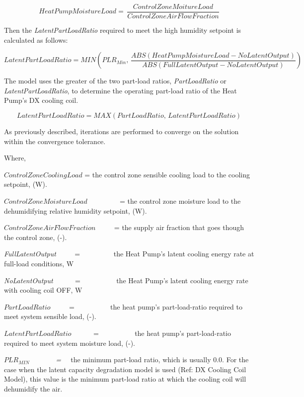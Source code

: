\begin{equation}
HeatPumpMoistureLoad = \,\frac{{ControlZoneMoitureLoad}}{{ControlZoneAirFlowFraction}}
\end{equation}

Then the \emph{LatentPartLoadRatio} required to meet the high humidity setpoint is calculated as follows:

\begin{equation}
LatentPartLoadRatio = MIN\left( {PL{R_{Min}},\,\frac{{ABS\left( {HeatPumpMoistureLoad - NoLatentOutput} \right)}}{{ABS\left( {FullLatentOutput - NoLatentOutput} \right)}}} \right)
\end{equation}

The model uses the greater of the two part-load ratios, \emph{PartLoadRatio} or \emph{LatentPartLoadRatio}, to determine the operating part-load ratio of the Heat Pump's DX cooling coil.

\begin{equation}
LatentPartLoadRatio = MAX\left( {PartLoadRatio,\,LatentPartLoadRatio} \right)
\end{equation}

As previously described, iterations are performed to converge on the solution within the convergence tolerance.

Where,

\(ControlZoneCoolingLoad\) = the control zone sensible cooling load to the cooling setpoint, (W).

\(ControlZoneMoistureLoad\) ~~~~~~~~ = the control zone moisture load to the dehumidifying relative humidity setpoint, (W).

\(ControlZoneAirFlowFraction\) ~~~~ = the supply air fraction that goes though the control zone, (-).

\emph{FullLatentOutput} ~~~~ = ~~~~~~~~~the Heat Pump's latent cooling energy rate at full-load conditions, W

\emph{NoLatentOutput} ~~~~~ = ~~~~~~~~~ the Heat Pump's latent cooling energy rate with cooling coil OFF, W

\(PartLoadRatio\) ~~~~ = ~~~~~~~~~ the heat pump's part-load-ratio required to meet system sensible load, (-).

\(LatentPartLoadRatio\) ~~~~~ = ~~~~~~~~~ the heat pump's part-load-ratio required to meet system moisture load, (-).

\(PL{R_{MIN}}\) \emph{~~~~~~ = ~~}the minimum part-load ratio, which is usually 0.0. For the case when the latent capacity degradation model is used (Ref: DX Cooling Coil Model), this value is the minimum part-load ratio at which the cooling coil will dehumidify the air.

